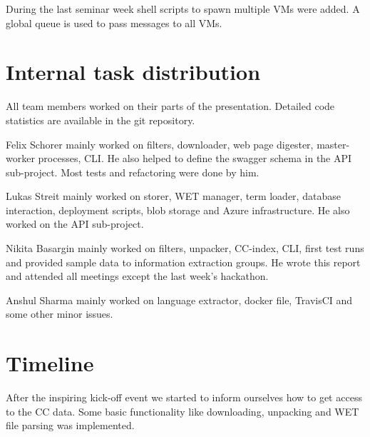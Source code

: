 \documentclass[DIV=calc, paper=a4, fontsize=11pt, twocolumn]{scrartcl}
\begin{document}
During the last seminar week shell scripts to spawn multiple VMs were added. A global queue is used to pass messages to all VMs.


\section*{Internal task distribution}
All team members worked on their parts of the presentation. 
Detailed code statistics are available in the git repository. 

Felix Schorer mainly worked on filters, downloader, web page digester, master-worker processes, CLI. 
He also helped to define the swagger schema in the API sub-project. 
Most tests and refactoring were done by him.

Lukas Streit mainly worked on storer, WET manager, term loader, database interaction, deployment scripts, blob storage and Azure infrastructure. 
He also worked on the API sub-project.

Nikita Basargin mainly worked on filters, unpacker, CC-index, CLI, first test runs and provided sample data to information extraction groups. 
He wrote this report and attended all meetings except the last week's hackathon.

Anshul Sharma mainly worked on language extractor, docker file, TravisCI and some other minor issues.



\section*{Timeline}
After the inspiring kick-off event we started to inform ourselves how to get access to the CC data. 
Some basic functionality like downloading, unpacking and WET file parsing was implemented.
\end{document}
